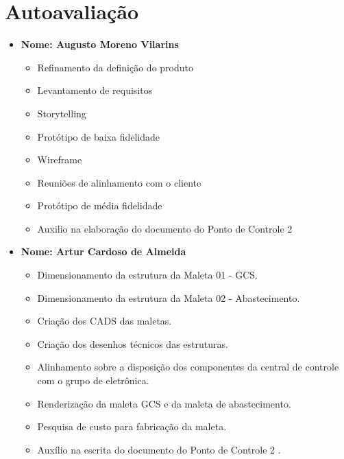 \chapter[Autoavaliação]{Autoavaliação}
\label{autoavaliacao}

\begin{itemize}

    
    \item \textbf{Nome: Augusto Moreno Vilarins}
    \begin{itemize}
    \item Refinamento da definição do produto
    \item Levantamento de requisitos
    \item Storytelling
    \item Protótipo de baixa fidelidade
    \item Wireframe
    \item Reuniões de alinhamento com o cliente
    \item Protótipo de média fidelidade
    \item Auxilio na elaboração do documento do Ponto de Controle 2
    \end{itemize}
    
    
    \item \textbf{Nome: Artur Cardoso de Almeida}
    \begin{itemize}
      \item Dimensionamento da estrutura da Maleta 01 - GCS.
      \item Dimensionamento da estrutura da Maleta 02 - Abastecimento.
      \item Criação dos CADS das maletas.
      \item Criação dos desenhos técnicos das estruturas.
      \item Alinhamento sobre a disposição dos componentes da central de controle com o grupo de eletrônica. 
      \item Renderização da maleta GCS e da maleta de abastecimento.
      \item Pesquisa de custo para fabricação da maleta.
      \item Auxílio na escrita do documento do Ponto de Controle 2 .
    \end{itemize}



\end{itemize}
